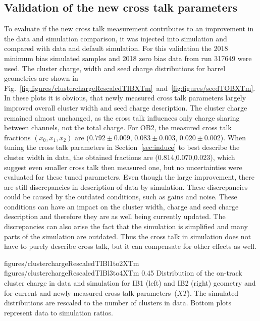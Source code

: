 \subsection{Validation of the new cross talk parameters}

To evaluate if the new cross talk measurement contributes to an improvement in the data and simulation comparison, it was injected into simulation and compared with data and default simulation. For this validation the 2018 minimum bias simulated samples and 2018 zero bias data from run 317649 were used. The cluster charge, width and seed charge distributions for barrel geometries are shown in Fig.~\ref{fig:figures/clusterchargeRescaledTIBXTm}~and~\ref{fig:figures/seedTOBXTm}. In these plots it is obvious, that newly measured cross talk parameters largely improved overall cluster width and seed charge description. The cluster charge remained almost unchanged, as the cross talk influences only charge sharing between channels, not the total charge.  For OB2, the measured cross talk fractions $(x_{0}, x_{1}, x_{2})$ are ($0.792 \pm 0.009 $, $0.083 \pm 0.003 $, $0.020 \pm 0.002$). When tuning the cross talk parameters in Section~\ref{sec:induce} to best describe the cluster width in data, the obtained fractions are (0.814,0.070,0.023), which suggest even smaller cross talk then measured one, but no uncertainties were evaluated for these tuned parameters. Even though the large improvement, there are still discrepancies in description of data by simulation. These discrepancies could be caused by the outdated conditions, such as gains and noise. These conditions can have an impact on the cluster width, charge and seed charge description and therefore they are as well being currently updated. The discrepancies can also arise the fact that the simulation is simplified and many parts of the simulation are outdated. Thus the cross talk in simulation does not have to purely describe cross talk, but it can compensate for other effects as well. 


                 {figures/clusterchargeRescaledTIBl1to2XTm} %
                 {figures/clusterchargeRescaledTIBl3to4XTm} %
                 {0.45}       %
                 { Distribution of the on-track cluster charge in data and simulation for IB1 (left) and IB2 (right) geometry and for current and newly measured cross talk parameters~($XT$).  The simulated distributions are rescaled to the number of clusters in data.  Bottom plots represent data to simulation ratios. }

